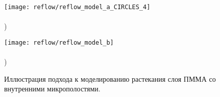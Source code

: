 \begin{figure}[h]
	\begin{minipage}{0.48\textwidth}
		\texttt{[image: reflow/reflow\_model\_a\_CIRCLES\_4]} \\
		\vspace{-28.5ex} \\ ) \\ \vspace{28.5ex}
	\end{minipage}
	\begin{minipage}{0.48\textwidth}
		\texttt{[image: reflow/reflow\_model\_b]} \\
		\vspace{-28.5ex} \\ ) \\ \vspace{28.5ex}
	\end{minipage}
	\vspace{-3.5em}
	\caption{Иллюстрация подхода к моделированию растекания слоя ПММА со внутренними микрополостями.}
	\label{fig:reflow_surface}
\end{figure}
